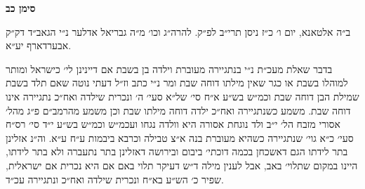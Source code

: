 \documentclass[12pt, openany]{book}
\newcommand{\chapname}{}
\newcommand{\newchap}[1]{
	\addcontentsline{toc}{chapter}{#1}
	\renewcommand{\chapname}{#1}
		\begin{center}
			\textbf{%
\fontsize{16pt}{16pt}\selectfont
				#1}
		\end{center}
}
\begin{document}
\newchap{סימן כב}
\begin{multicols}{2}
ב״ה אלטאנא, יום ו׳ כ״ז ניסן תרי״ב לפ״ק. להרה״ג וכו׳ מ״ה גבריאל אדלער נ״י הגאב״ד דק״ק אבערדארף יע״א.\\\vspace{0pt}

בדבר שאלת מעכ״ת נ״י בנתגיירה מעוברת וילדה בן בשבת אם דיינינן לי׳ כישראל ומותר למוהלו בשבת או כגר שאין מילתו דוחה שבת ומר נ״י כתב וז״ל דעתי נוטה שאם תלד בשבת שמילת הבן דוחה שבת וכמ״ש בש״ע א״ח סי׳ של״א סעי׳ ה׳ ונכרית שילדה ואח״כ נתגיירה אינו דוחה שבת. משמע כשנתגיירה ואח״כ ילדה דוחה מילתו שבת וכן משמע מהרמב״ם פ״ג מהל׳ אסורי מזבח הל׳ י״ב ולד נוגחת אסורה היא וולדה נגחו ועכמ״ש וכמ״ש בש״ע י״ד סי׳ רס״ח סעי׳ כ״א גוי׳ שנתגיירה כשהיא מעוברת בנה א״צ טבילה וכרבא ביבמות ע״ח ע״א. וה״נ אזלינן בתר לידתו הגם דאשכחן בכמה דוכתי׳ ביבום ובירושה דאזלינן בתר נתעברה ולא בתר לידתו, היינו במקום שתלוי׳ באב, אבל לענין מילה ד״ש דעיקר תלוי באם אם היא נכרית אם ישראלית, שפיר כ׳ הש״ע בא״ח ונכרית שילדה ואח״כ ונתגיירה עכ״ד.\\\vspace{0pt}


\end{multicols}
\end{document}
